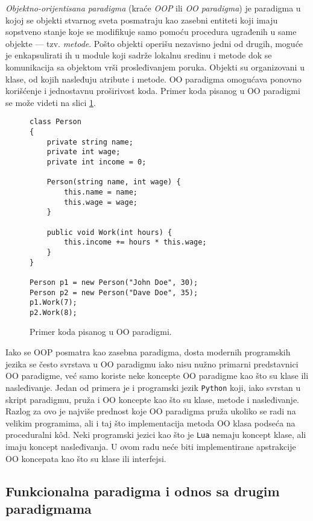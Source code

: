 \emph{Objektno-orijentisana paradigma} (kraće \emph{OOP} ili \emph{OO paradigma}) je paradigma u kojoj se objekti stvarnog sveta posmatraju kao zasebni entiteti koji imaju sopstveno stanje koje se modifikuje samo pomoću procedura ugrađenih u same objekte --- tzv. \emph{metode}. Pošto objekti operišu nezavisno jedni od drugih, moguće je enkapsulirati ih u module koji sadrže lokalnu sredinu i metode dok se komunikacija sa objektom vrši prosleđivanjem poruka. Objekti su organizovani u klase, od kojih nasleđuju atribute i metode. OO paradigma omogućava ponovno korišćenje i jednostavnu proširivost koda. Primer koda pisanog u OO paradigmi se može videti na slici \ref{fig:ParadigmOO}.

\begin{figure}[h!]
\begin{lstlisting}
class Person
{
    private string name;
    private int wage;
    private int income = 0;

    Person(string name, int wage) {
        this.name = name;
        this.wage = wage;
    }

    public void Work(int hours) {
        this.income += hours * this.wage;
    }
}

Person p1 = new Person("John Doe", 30);
Person p2 = new Person("Dave Doe", 35);
p1.Work(7);
p2.Work(8);
\end{lstlisting}
\caption{Primer koda pisanog u OO paradigmi.}
\label{fig:ParadigmOO}
\end{figure}

Iako se OOP posmatra kao zasebna paradigma, dosta modernih programskih jezika se često svrstava u OO paradigmu iako nisu nužno primarni predstavnici OO paradigme, već samo koriste neke koncepte OO paradigme kao što su klase ili nasleđivanje. Jedan od primera je i programski jezik \texttt{Python} koji, iako svrstan u skript paradigmu, pruža i OO koncepte kao što su klase, metode i nasleđivanje. Razlog za ovo je najviše prednost koje OO paradigma pruža ukoliko se radi na velikim programima, ali i taj što implementacija metoda OO klasa podseća na proceduralni k\^od. Neki programski jezici kao što je \texttt{Lua} nemaju koncept klase, ali imaju koncept nasleđivanja. U ovom radu neće biti implementirane apstrakcije OO koncepata kao što su klase ili interfejsi.

\subsection{Funkcionalna paradigma i odnos sa drugim paradigmama}
\label{subsec:ParadigmFunctional}

